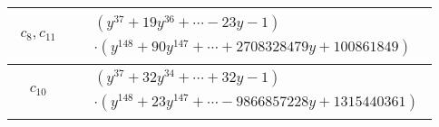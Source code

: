 \documentclass[1p]{elsarticle_modified}
\theoremstyle{definition}
\begin{document}
\begin{tabular}{m{50pt}|m{274pt}}
\hline $$\begin{aligned}c_{8},c_{11}\end{aligned}$$&$\begin{aligned}
&(y^{37}+19 y^{36}+\cdots-23 y-1)\\
&\cdot(y^{148}+90 y^{147}+\cdots+2708328479 y+100861849)
\end{aligned}$\\
\hline $$\begin{aligned}c_{10}\end{aligned}$$&$\begin{aligned}
&(y^{37}+32 y^{34}+\cdots+32 y-1)\\
&\cdot(y^{148}+23 y^{147}+\cdots-9866857228 y+1315440361)
\end{aligned}$\\
\hline
\end{tabular}
\vskip 2pc
\end{document}
